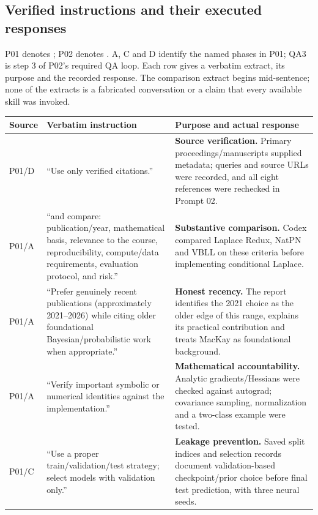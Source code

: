 \documentclass[10pt,a4paper]{article}
\begin{document}
\subsection{Verified instructions and their executed responses}
P01 denotes ;
P02 denotes .
A, C and D identify the named phases in P01; QA3 is step 3 of P02's required
QA loop. Each row gives a verbatim extract, its purpose and the recorded response.
The comparison extract begins mid-sentence; none of the extracts is a fabricated
conversation or a claim that every available skill was invoked.
\begin{table}[H]\centering
\fontsize{9}{11}\selectfont
\setlength{\tabcolsep}{4pt}
\renewcommand{\arraystretch}{1.15}
\begin{tabularx}{\linewidth}{>{\raggedright\arraybackslash}p{19mm}>{\raggedright\arraybackslash}p{67mm}>{\raggedright\arraybackslash}X}
\toprule Source & Verbatim instruction & Purpose and actual response\\
\midrule
P01/D & ``Use only verified citations.'' & \textbf{Source verification.} Primary proceedings/manuscripts supplied metadata; queries and source URLs were recorded, and all eight references were rechecked in Prompt 02. \\
P01/A & ``and compare: publication/year, mathematical basis, relevance to the course, reproducibility, compute/data requirements, evaluation protocol, and risk.'' & \textbf{Substantive comparison.} Codex compared Laplace Redux, NatPN and VBLL on these criteria before implementing conditional Laplace. \\
P01/A & ``Prefer genuinely recent publications (approximately 2021--2026) while citing older foundational Bayesian/probabilistic work when appropriate.'' & \textbf{Honest recency.} The report identifies the 2021 choice as the older edge of this range, explains its practical contribution and treats MacKay as foundational background. \\
P01/A & ``Verify important symbolic or numerical identities against the implementation.'' & \textbf{Mathematical accountability.} Analytic gradients/Hessians were checked against autograd; covariance sampling, normalization and a two-class example were tested. \\
P01/C & ``Use a proper train/validation/test strategy; select models with validation only.'' & \textbf{Leakage prevention.} Saved split indices and selection records document validation-based checkpoint/prior choice before final test prediction, with three neural seeds. \\

\end{tabularx}
\end{table}
\end{document}
